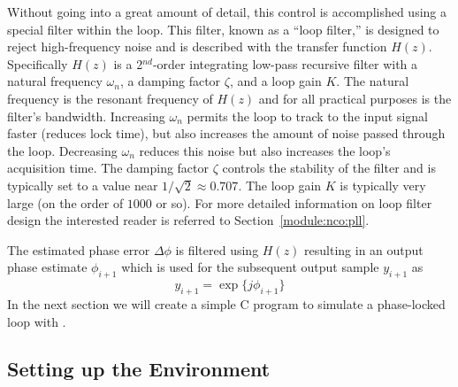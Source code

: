 Without going into a great amount of detail, this control is
accomplished using a special filter within the loop.
This filter, known as a ``loop filter,'' is designed to reject
high-frequency noise and is described with the transfer function $H(z)$.
Specifically $H(z)$ is a 2$^{nd}$-order integrating low-pass recursive
filter with
a natural frequency $\omega_n$,
a damping factor $\zeta$, and
a loop gain $K$.
The natural frequency is the resonant frequency of $H(z)$ and for all
practical purposes is the filter's bandwidth.
Increasing $\omega_n$ permits the loop to track to the input signal
faster (reduces lock time), but also increases the amount of noise
passed through the loop.
Decreasing $\omega_n$ reduces this noise but also increases the loop's
acquisition time.
The damping factor $\zeta$ controls the stability of the filter and is
typically set to a value near $1/\sqrt{2} \approx 0.707$.
The loop gain $K$ is typically very large
(on the order of $1000$ or so).
For more detailed information on loop filter design the interested
reader is referred to Section~\ref{module:nco:pll}.

The estimated phase error $\Delta\phi$ is filtered using $H(z)$
resulting in an output phase estimate $\phi_{i+1}$
which is used for the subsequent output sample $y_{i+1}$ as
%
\begin{equation}
\label{eqn:tutoral:pll:y1}
    y_{i+1} = \exp\bigl\{ j\phi_{i+1} \bigr\}
\end{equation}
%
%
%
%
%
In the next section we will create a simple C program to simulate a
phase-locked loop with \liquid.


\subsection{Setting up the Environment}
\label{tutorial:pll:environment}

